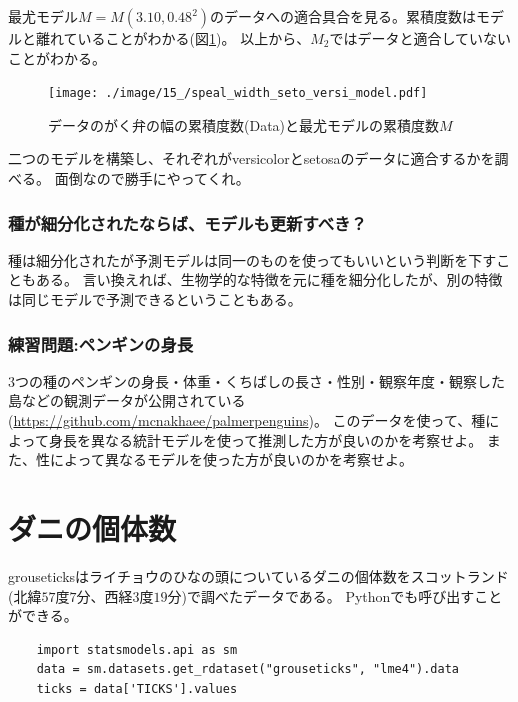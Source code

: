 最尤モデル$M=M(3.10,0.48^2)$のデータへの適合具合を見る。累積度数はモデルと離れていることがわかる(図\ref{fig:speal_width_setosa_versi_model})。
以上から、$M_2$ではデータと適合していないことがわかる。


\begin{figure}
    \begin{center}
        \texttt{[image: ./image/15\_/speal\_width\_seto\_versi\_model.pdf]}
        \caption{データのがく弁の幅の累積度数(Data)と最尤モデルの累積度数$M$}
        \label{fig:speal_width_setosa_versi_model}
    \end{center}
\end{figure}


二つのモデルを構築し、それぞれがversicolorとsetosaのデータに適合するかを調べる。
面倒なので勝手にやってくれ。


\subsubsection{種が細分化されたならば、モデルも更新すべき？}
種は細分化されたが予測モデルは同一のものを使ってもいいという判断を下すこともある。
言い換えれば、生物学的な特徴を元に種を細分化したが、別の特徴は同じモデルで予測できるということもある。

\subsubsection{練習問題:ペンギンの身長}
3つの種のペンギンの身長・体重・くちばしの長さ・性別・観察年度・観察した島などの観測データが公開されている(\url{https://github.com/mcnakhaee/palmerpenguins})。
このデータを使って、種によって身長を異なる統計モデルを使って推測した方が良いのかを考察せよ。
また、性によって異なるモデルを使った方が良いのかを考察せよ。


\section{ダニの個体数}
grouseticksはライチョウのひなの頭についているダニの個体数をスコットランド(北緯$57$度$7$分、西経$3$度$19$分)で調べたデータである。
Pythonでも呼び出すことができる。

\begin{lstlisting}
    import statsmodels.api as sm
    data = sm.datasets.get_rdataset("grouseticks", "lme4").data
    ticks = data['TICKS'].values
\end{lstlisting}

